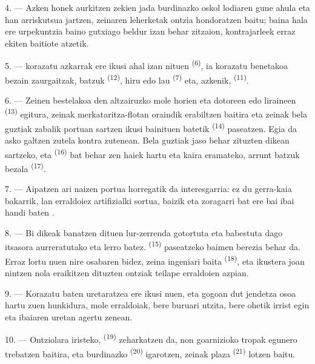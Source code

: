 4. --- Azken honek  aurkitzen zekien jada burdinazko oskol lodiaren
gune ahula eta han  arriskutsua jartzen, zeinaren leherketak
ontzia hondoratzen baitu; baina hala ere urpekuntzia baino gutxiago beldur izan
behar zitzaion, kontrajarleek erraz ekiten baitiote atzetik.

5. ---  korazatu azkarrak ere ikusi ahal izan nituen
\textsuperscript{(6)}, ia korazatu benetakoa bezain zaurgaitzak,
 batzuk \textsuperscript{(12)}, hiru edo lau
 \textsuperscript{(7)} eta, azkenik, 
\textsuperscript{(11)}. 

6. --- Zeinen bestelakoa den altzairuzko mole horien eta 
dotoreen edo  liraineen \textsuperscript{(13)} egitura, zeinak
merkataritza-flotan oraindik erabiltzen baitira eta zeinak bela guztiak zabalik
portuan sartzen ikusi bainituen  batetik
\textsuperscript{(14)} paseatzen. Egia da asko galtzen zutela 
kontra zutenean. Bela guztiak jaso behar zituzten dikean sartzeko, eta
 \textsuperscript{(16)} bat behar zen haiek hartu eta kaira
eramateko,  arrunt batzuk bezala \textsuperscript{(17)}.

\VUsaut{3.0mm}
\VUsaut{3.0mm}

7. --- Aipatzen ari naizen portua horregatik da interesgarria: ez du gerra-kaia
bakarrik, lan erraldoiez artifizialki sortua, baizik eta 
zoragarri bat ere bai ibai handi baten .

8. --- Bi dikeak banatzen dituen lur-zerrenda gotortuta eta babestuta dago
itsasora aurreratutako  eta  lerro batez.
 \textsuperscript{(15)} paseatzeko baimen berezia behar da.
Erraz lortu nuen nire osabaren bidez, zeina ingeniari baita
 \textsuperscript{(18)}, eta ikustera joan nintzen nola
eraikitzen dituzten ontziak teilape erraldoien azpian.

9. --- Korazatu baten uretaratzea ere ikusi nuen, eta gogoan dut jendetza osoa
hartu zuen hunkidura, mole erraldoiak, bere buruari utzita, bere ohetik irrist
egin eta ibaiaren uretan agertu zenean.

10. --- Ontziolara iristeko,  \textsuperscript{(19)}
zeharkatzen da, non goarnizioko tropak egunero trebatzen baitira, eta burdinazko
 \textsuperscript{(20)} igarotzen, zeinak plaza
 \textsuperscript{(21)} lotzen baitu.

